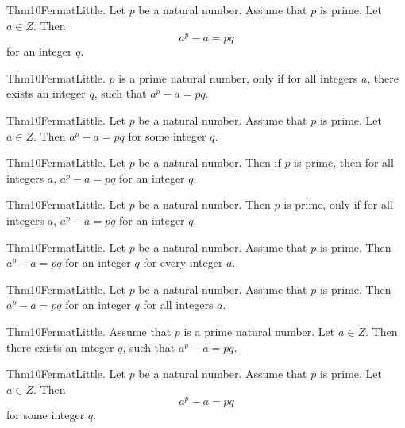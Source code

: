 \documentclass{article}
\begin{document}
Thm10FermatLittle. Let $p$ be a natural number. Assume that $p$ is prime. Let $a \in Z$. Then $$a ^ {p}- a = p q$$ for an integer $q$.

Thm10FermatLittle. $p$ is a prime natural number, only if for all integers $a$, there exists an integer $q$, such that $a ^ {p}- a = p q$.

Thm10FermatLittle. Let $p$ be a natural number. Assume that $p$ is prime. Let $a \in Z$. Then $a ^ {p}- a = p q$ for some integer $q$.

Thm10FermatLittle. Let $p$ be a natural number. Then if $p$ is prime, then for all integers $a$, $a ^ {p}- a = p q$ for an integer $q$.

Thm10FermatLittle. Let $p$ be a natural number. Then $p$ is prime, only if for all integers $a$, $a ^ {p}- a = p q$ for an integer $q$.

Thm10FermatLittle. Let $p$ be a natural number. Assume that $p$ is prime. Then $a ^ {p}- a = p q$ for an integer $q$ for every integer $a$.

Thm10FermatLittle. Let $p$ be a natural number. Assume that $p$ is prime. Then $a ^ {p}- a = p q$ for an integer $q$ for all integers $a$.

Thm10FermatLittle. Assume that $p$ is a prime natural number. Let $a \in Z$. Then there exists an integer $q$, such that $a ^ {p}- a = p q$.

Thm10FermatLittle. Let $p$ be a natural number. Assume that $p$ is prime. Let $a \in Z$. Then $$a ^ {p}- a = p q$$ for some integer $q$.
\end{document}
